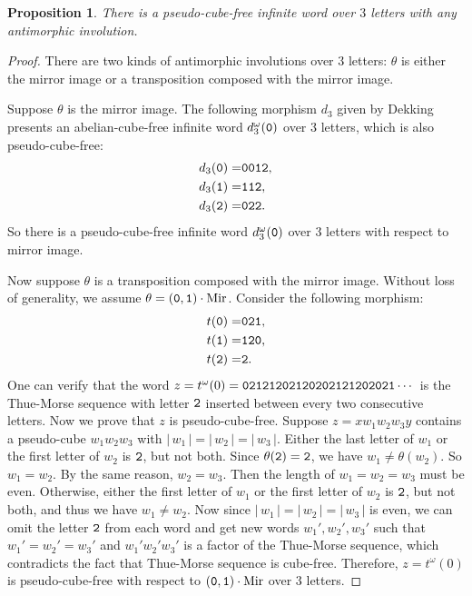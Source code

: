 \documentclass[12pt]{article}
\def\abs#1{{|\,#1\,|}}
\def\mirror{{\operatorname{Mir}}}
\def\mtt#1{{\tt #1}}
\newtheorem{proposition}[theorem]{Proposition}
\begin{document}
\begin{proposition}\label{prop:pseudodekking}
There is a pseudo-cube-free infinite word over $3$ letters with any
antimorphic involution.
\end{proposition}
\begin{proof}
There are two kinds of antimorphic involutions over $3$ letters:
$\theta$ is either the mirror image or a transposition composed with
the mirror image.

Suppose $\theta$ is the mirror image. The following morphism $d_3$
given by Dekking \cite{Dekking1979} presents an abelian-cube-free
infinite word $d_3^\omega(\mtt0)$ over $3$ letters, which is also
pseudo-cube-free:
\begin{align*}
d_3(\mtt0)=&\mtt0\mtt0\mtt1\mtt2,\\
d_3(\mtt1)=&\mtt1\mtt1\mtt2,\\
d_3(\mtt2)=&\mtt0\mtt2\mtt2.
\end{align*}
So there is a pseudo-cube-free infinite word $d_3^\omega(\mtt0)$
over $3$ letters with respect to mirror image.

Now suppose $\theta$ is a transposition composed with the mirror
image. Without loss of generality, we assume
$\theta=(\mtt0,\mtt1)\cdot\mirror$. Consider the following morphism:
\begin{align*}
t(\mtt0)=&\mtt0\mtt2\mtt1,\\
t(\mtt1)=&\mtt1\mtt2\mtt0,\\
t(\mtt2)=&\mtt2.
\end{align*}
One can verify that the word
$z=t^\omega(0)=\mtt0\mtt2\mtt1\mtt2\mtt1\mtt2\mtt0\mtt2\mtt1\mtt2\mtt0\mtt2\mtt0\mtt2\mtt1\mtt2\mtt1\mtt2\mtt0\mtt2\mtt0\mtt2\mtt1\cdots$
is the Thue-Morse sequence \cite{Thue1912} with letter $\mtt2$
inserted between every two consecutive letters. Now we prove that
$z$ is pseudo-cube-free. Suppose $z=xw_1w_2w_3y$ contains a
pseudo-cube $w_1w_2w_3$ with $\abs{w_1}=\abs{w_2}=\abs{w_3}$. Either
the last letter of $w_1$ or the first letter of $w_2$ is $\mtt2$,
but not both. Since $\theta(\mtt2)=\mtt2$, we have
$w_1\neq\theta(w_2)$. So $w_1=w_2$. By the same reason, $w_2=w_3$.
Then the length of $w_1=w_2=w_3$ must be even. Otherwise, either the
first letter of $w_1$ or the first letter of $w_2$ is $\mtt2$, but
not both, and thus we have $w_1\neq w_2$. Now since
$\abs{w_1}=\abs{w_2}=\abs{w_3}$ is even, we can omit the letter
$\mtt2$ from each word and get new words $w_1', w_2', w_3'$ such
that $w_1'=w_2'=w_3'$ and $w_1'w_2'w_3'$ is a factor of the
Thue-Morse sequence, which contradicts the fact that Thue-Morse
sequence is cube-free. Therefore, $z=t^\omega(0)$ is
pseudo-cube-free with respect to $(\mtt0,\mtt1)\cdot\mirror$ over
$3$ letters.
\end{proof}
\end{document}
